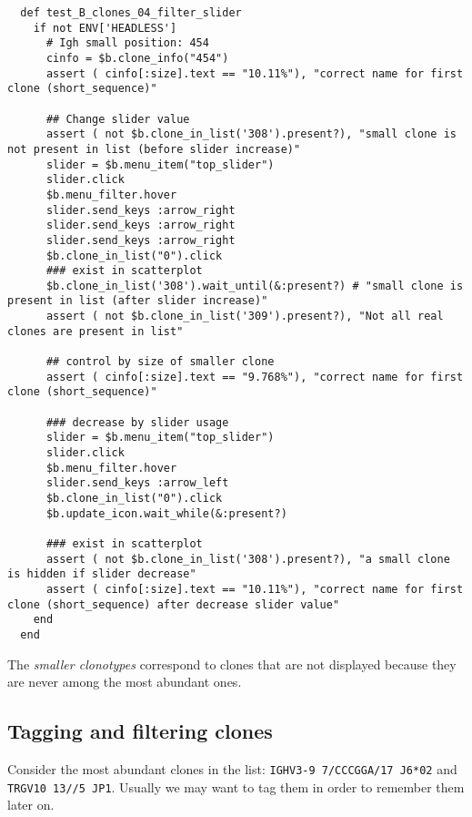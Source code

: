 \begin{verbatim}
  def test_B_clones_04_filter_slider
    if not ENV['HEADLESS']
      # Igh small position: 454
      cinfo = $b.clone_info("454")
      assert ( cinfo[:size].text == "10.11%"), "correct name for first clone (short_sequence)"

      ## Change slider value
      assert ( not $b.clone_in_list('308').present?), "small clone is not present in list (before slider increase)"
      slider = $b.menu_item("top_slider")
      slider.click
      $b.menu_filter.hover
      slider.send_keys :arrow_right 
      slider.send_keys :arrow_right
      slider.send_keys :arrow_right
      $b.clone_in_list("0").click
      ### exist in scatterplot
      $b.clone_in_list('308').wait_until(&:present?) # "small clone is present in list (after slider increase)"
      assert ( not $b.clone_in_list('309').present?), "Not all real clones are present in list"

      ## control by size of smaller clone
      assert ( cinfo[:size].text == "9.768%"), "correct name for first clone (short_sequence)"

      ### decrease by slider usage
      slider = $b.menu_item("top_slider")
      slider.click
      $b.menu_filter.hover
      slider.send_keys :arrow_left 
      $b.clone_in_list("0").click
      $b.update_icon.wait_while(&:present?)

      ### exist in scatterplot
      assert ( not $b.clone_in_list('308').present?), "a small clone is hidden if slider decrease"
      assert ( cinfo[:size].text == "10.11%"), "correct name for first clone (short_sequence) after decrease slider value"
    end
  end
\end{verbatim}

The \textit{smaller clonotypes} correspond to clones that are not displayed
because they are never among the most abundant ones.


\subsection{Tagging and filtering clones}

Consider the most abundant clones in the list:  \texttt{IGHV3-9 7/CCCGGA/17 J6*02} and  \texttt{TRGV10 13//5 JP1}.
Usually we may want to tag them in order to remember them later on.

